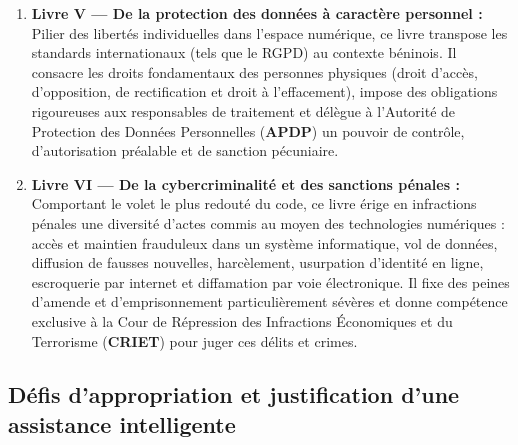 \begin{enumerate}
    \item \textbf{Livre V — De la protection des données à caractère personnel :} \\
    Pilier des libertés individuelles dans l'espace numérique, ce livre transpose les standards internationaux (tels que le RGPD) au contexte béninois. Il consacre les droits fondamentaux des personnes physiques (droit d'accès, d'opposition, de rectification et droit à l'effacement), impose des obligations rigoureuses aux responsables de traitement et délègue à l'Autorité de Protection des Données Personnelles (\textbf{APDP}) un pouvoir de contrôle, d'autorisation préalable et de sanction pécuniaire.

    \item \textbf{Livre VI — De la cybercriminalité et des sanctions pénales :} \\
    Comportant le volet le plus redouté du code, ce livre érige en infractions pénales une diversité d'actes commis au moyen des technologies numériques : accès et maintien frauduleux dans un système informatique, vol de données, diffusion de fausses nouvelles, harcèlement, usurpation d'identité en ligne, escroquerie par internet et diffamation par voie électronique. Il fixe des peines d'amende et d'emprisonnement particulièrement sévères et donne compétence exclusive à la Cour de Répression des Infractions Économiques et du Terrorisme (\textbf{CRIET}) pour juger ces délits et crimes.
\end{enumerate}

\subsection{Défis d'appropriation et justification d'une assistance intelligente}

